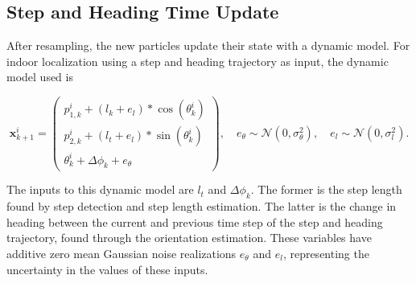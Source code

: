 	
\subsection{Step and Heading Time Update}
	After resampling, the new particles update their state with a dynamic model. For indoor localization using a step and heading trajectory as input, the dynamic model used is
	
	\begin{equation}
		\label{eq:SHS_dynamic_model_with_noise}
		\mathbf{x}^i_{k + 1}
		=
		\left(\begin{array}{l}
			p_{1,k}^i + (l_{k} + e_l) * \cos (\theta_{k}^i) \\
			p_{2,k}^i + (l_{t} + e_l) * \sin (\theta_{k}^i) \\
			\theta_{k}^i + \Delta \phi_k + e_\theta 
		\end{array}\right), \quad
		e_{\theta} \sim \mathcal{N}\left(0, \sigma_{\theta}^{2}\right), \quad e_{l} \sim \mathcal{N}\left(0, \sigma_{l}^{2}\right).
	\end{equation}

The inputs to this dynamic model are $l_{t}$ and $\Delta \phi_k$. The former is the step length found by step detection and step length estimation. The latter is the change in heading between the current and previous time step of the step and heading trajectory, found through the orientation estimation. These variables have additive zero mean Gaussian noise realizations $e_{\theta}$ and $e_{l}$, representing the uncertainty in the values of these inputs.\par 

